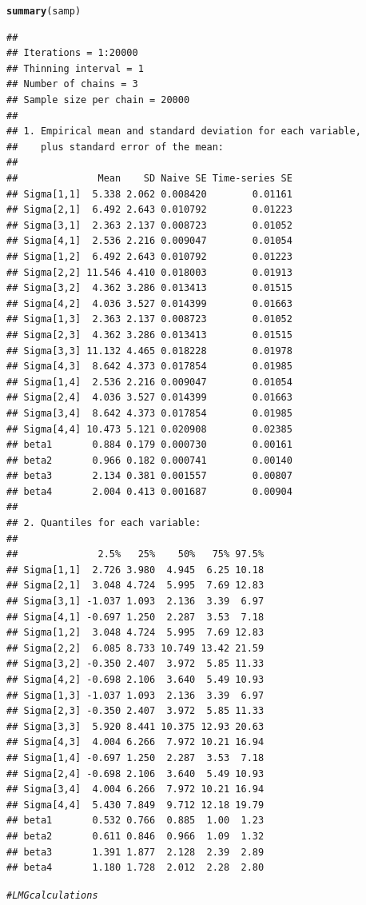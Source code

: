\documentclass[11pt,a4paper,twoside]{book}\usepackage[]{graphicx}\usepackage[]{color}
\makeatletter
\newcommand{\hlcom}[1]{\textcolor[rgb]{0.678,0.584,0.686}{\textit{#1}}}%
\newcommand{\hlstd}[1]{\textcolor[rgb]{0.345,0.345,0.345}{#1}}%
\newcommand{\hlkwd}[1]{\textcolor[rgb]{0.737,0.353,0.396}{\textbf{#1}}}%
\newenvironment{kframe}{%
 \def\at@end@of@kframe{}%
 \ifinner\ifhmode%
  \def\at@end@of@kframe{\end{minipage}}%
  \begin{minipage}{\columnwidth}%
 \fi\fi%
 \def\FrameCommand##1{\hskip\@totalleftmargin \hskip-\fboxsep
 \colorbox{shadecolor}{##1}\hskip-\fboxsep
     \hskip-\linewidth \hskip-\@totalleftmargin \hskip\columnwidth}%
 \MakeFramed {\advance\hsize-\width
   \@totalleftmargin\z@ \linewidth\hsize
   \@setminipage}}%
 {\par\unskip\endMakeFramed%
 \at@end@of@kframe}
\newenvironment{knitrout}{}{} %
\makeatother
\begin{document}
\begin{knitrout}
\begin{kframe}
\begin{alltt}
\hlkwd{summary}\hlstd{(samp)}
\end{alltt}
\begin{verbatim}
## 
## Iterations = 1:20000
## Thinning interval = 1 
## Number of chains = 3 
## Sample size per chain = 20000 
## 
## 1. Empirical mean and standard deviation for each variable,
##    plus standard error of the mean:
## 
##              Mean    SD Naive SE Time-series SE
## Sigma[1,1]  5.338 2.062 0.008420        0.01161
## Sigma[2,1]  6.492 2.643 0.010792        0.01223
## Sigma[3,1]  2.363 2.137 0.008723        0.01052
## Sigma[4,1]  2.536 2.216 0.009047        0.01054
## Sigma[1,2]  6.492 2.643 0.010792        0.01223
## Sigma[2,2] 11.546 4.410 0.018003        0.01913
## Sigma[3,2]  4.362 3.286 0.013413        0.01515
## Sigma[4,2]  4.036 3.527 0.014399        0.01663
## Sigma[1,3]  2.363 2.137 0.008723        0.01052
## Sigma[2,3]  4.362 3.286 0.013413        0.01515
## Sigma[3,3] 11.132 4.465 0.018228        0.01978
## Sigma[4,3]  8.642 4.373 0.017854        0.01985
## Sigma[1,4]  2.536 2.216 0.009047        0.01054
## Sigma[2,4]  4.036 3.527 0.014399        0.01663
## Sigma[3,4]  8.642 4.373 0.017854        0.01985
## Sigma[4,4] 10.473 5.121 0.020908        0.02385
## beta1       0.884 0.179 0.000730        0.00161
## beta2       0.966 0.182 0.000741        0.00140
## beta3       2.134 0.381 0.001557        0.00807
## beta4       2.004 0.413 0.001687        0.00904
## 
## 2. Quantiles for each variable:
## 
##              2.5%   25%    50%   75% 97.5%
## Sigma[1,1]  2.726 3.980  4.945  6.25 10.18
## Sigma[2,1]  3.048 4.724  5.995  7.69 12.83
## Sigma[3,1] -1.037 1.093  2.136  3.39  6.97
## Sigma[4,1] -0.697 1.250  2.287  3.53  7.18
## Sigma[1,2]  3.048 4.724  5.995  7.69 12.83
## Sigma[2,2]  6.085 8.733 10.749 13.42 21.59
## Sigma[3,2] -0.350 2.407  3.972  5.85 11.33
## Sigma[4,2] -0.698 2.106  3.640  5.49 10.93
## Sigma[1,3] -1.037 1.093  2.136  3.39  6.97
## Sigma[2,3] -0.350 2.407  3.972  5.85 11.33
## Sigma[3,3]  5.920 8.441 10.375 12.93 20.63
## Sigma[4,3]  4.004 6.266  7.972 10.21 16.94
## Sigma[1,4] -0.697 1.250  2.287  3.53  7.18
## Sigma[2,4] -0.698 2.106  3.640  5.49 10.93
## Sigma[3,4]  4.004 6.266  7.972 10.21 16.94
## Sigma[4,4]  5.430 7.849  9.712 12.18 19.79
## beta1       0.532 0.766  0.885  1.00  1.23
## beta2       0.611 0.846  0.966  1.09  1.32
## beta3       1.391 1.877  2.128  2.39  2.89
## beta4       1.180 1.728  2.012  2.28  2.80
\end{verbatim}
\begin{alltt}
\hlcom{#LMG calculations}


\end{alltt}
\end{kframe}
\end{knitrout}
\end{document}
